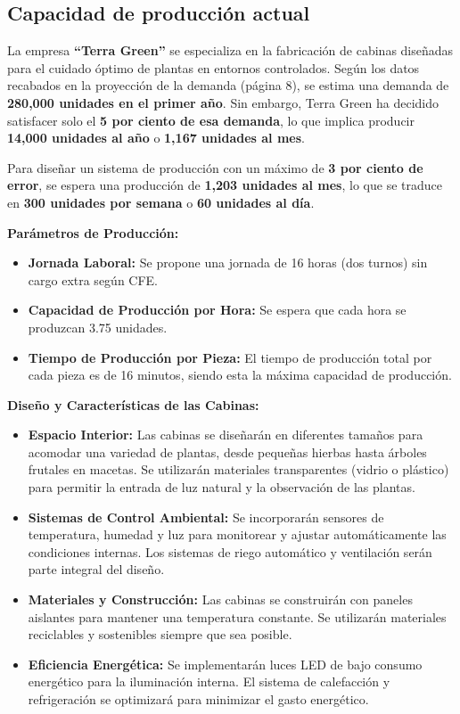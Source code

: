 \subsection{Capacidad de producción actual}


La empresa \textbf{“Terra Green”} se especializa en la fabricación de cabinas diseñadas para el cuidado óptimo de plantas en entornos controlados. Según los datos recabados en la proyección de la demanda (página 8), se estima una demanda de \textbf{280,000 unidades en el primer año}. Sin embargo, Terra Green ha decidido satisfacer solo el \textbf{5 por ciento de esa demanda}, lo que implica producir \textbf{14,000 unidades al año} o \textbf{1,167 unidades al mes}.

Para diseñar un sistema de producción con un máximo de \textbf{3 por ciento de error}, se espera una producción de \textbf{1,203 unidades al mes}, lo que se traduce en \textbf{300 unidades por semana} o \textbf{60 unidades al día}.

\textbf{Parámetros de Producción:}
\begin{itemize}
    \item \textbf{Jornada Laboral:} Se propone una jornada de 16 horas (dos turnos) sin cargo extra según CFE.
    \item \textbf{Capacidad de Producción por Hora:} Se espera que cada hora se produzcan 3.75 unidades.
    \item \textbf{Tiempo de Producción por Pieza:} El tiempo de producción total por cada pieza es de 16 minutos, siendo esta la máxima capacidad de producción.
\end{itemize}

\textbf{Diseño y Características de las Cabinas:}
\begin{itemize}
    \item \textbf{Espacio Interior:} Las cabinas se diseñarán en diferentes tamaños para acomodar una variedad de plantas, desde pequeñas hierbas hasta árboles frutales en macetas. Se utilizarán materiales transparentes (vidrio o plástico) para permitir la entrada de luz natural y la observación de las plantas.
    \item \textbf{Sistemas de Control Ambiental:} Se incorporarán sensores de temperatura, humedad y luz para monitorear y ajustar automáticamente las condiciones internas. Los sistemas de riego automático y ventilación serán parte integral del diseño.
    \item \textbf{Materiales y Construcción:} Las cabinas se construirán con paneles aislantes para mantener una temperatura constante. Se utilizarán materiales reciclables y sostenibles siempre que sea posible.
    \item \textbf{Eficiencia Energética:} Se implementarán luces LED de bajo consumo energético para la iluminación interna. El sistema de calefacción y refrigeración se optimizará para minimizar el gasto energético.
\end{itemize}

